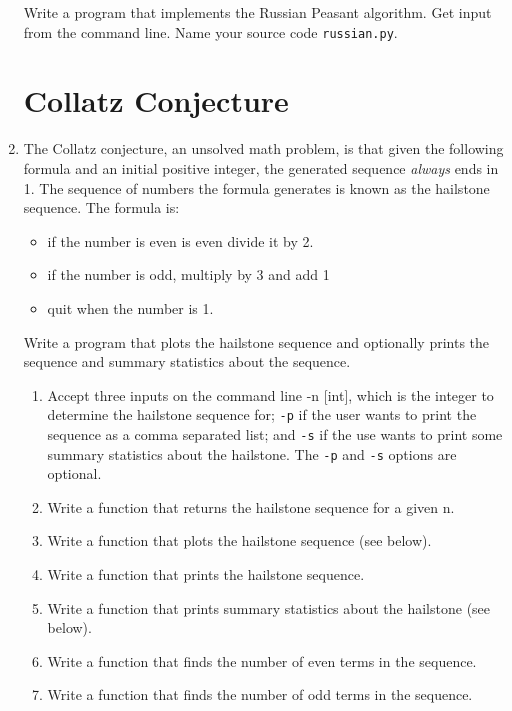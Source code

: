 \documentclass[12pt]{article}
\begin{document}
\begin{enumerate}
Write a program that implements the Russian Peasant algorithm.  Get input from the command line. Name your source code \texttt{russian.py}.




  \section*{Collatz Conjecture}


  \item[] The Collatz conjecture, an unsolved math problem, is that given the following formula and an initial positive integer, the generated sequence \emph{always} ends in 1. The sequence of numbers the formula generates is known as the hailstone sequence. The formula is:
    \begin{itemize}
      \item[] if the number is even is even divide it by 2.

      \item[] if the number is odd, multiply by 3 and add 1

      \item[] quit when the number is 1.
\end{itemize}

Write a program that plots the hailstone sequence and optionally prints the sequence and summary statistics about the sequence.

  \begin{enumerate}
    \item Accept three inputs on the command line -n [int], which is the integer to determine the hailstone sequence for; \texttt{-p} if the user wants to print the sequence as a comma separated list; and \texttt{-s} if the use wants to print some summary statistics about the hailstone. The \texttt{-p} and \texttt{-s} options are optional. 
  \item Write a function that returns the hailstone sequence for a given n.
  \item Write a function that plots the hailstone sequence (see below).
  \item Write a function that prints the hailstone sequence.
  \item Write a function that prints summary statistics about the hailstone (see below). 
  \item Write a function that finds the number of even terms in the sequence.
  \item Write a function that finds the number of odd terms in the sequence.
  \end{enumerate}


\end{enumerate}
\end{document}
